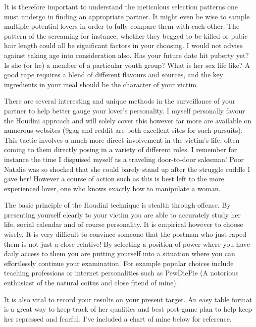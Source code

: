 It is therefore important to understand the meticulous selection patterns one 
must undergo in finding an appropriate partner. It might even be wise to sample 
multiple potential lovers in order to fully compare them with each other. The 
pattern of the screaming for instance, whether they begged to be killed or pubic 
hair length could all be significant factors in your choosing. I would not 
advise against taking age into consideration also. Has your future date hit 
puberty yet? Is she (or he) a member of a particular youth group? What is her 
sex life like? A good rape requires a blend of different flavours and sources, 
and the key ingredients in your meal should be the character of your victim.

There are several interesting and unique methods in the surveillance of your 
partner to help better gauge your lover’s personality. I myself personally 
favour the Houdini approach and will solely cover this however far more are 
available on numerous websites (9gag and reddit are both excellent sites for 
such pursuits). This tactic involves a much more direct involvement in the 
victim’s life, often coming to them directly posing in a variety of different 
roles. I remember for instance the time I disguised myself as a traveling 
door-to-door salesman! Poor Natalie was so shocked that she could barely stand 
up after the struggle cuddle I gave her! However a course of action such as this 
is best left to the more experienced lover, one who knows exactly how to 
manipulate a woman.

The basic principle of the Houdini technique is stealth through offense. By 
presenting yourself clearly to your victim you are able to accurately study her 
life, social calendar and of course personality. It is empirical however to 
choose wisely. It is very difficult to convince someone that the postman who 
just raped them is not just a close relative!  By selecting a position of power 
where you have daily access to them you are putting yourself into a situation 
where you can effortlessly continue your examination. For example popular 
choices include teaching professions or internet personalities such as PewDiePie 
(A notorious enthusiast of the natural coitus and close friend of mine).

It is also vital to record your results on your present target. An easy table 
format is a great way to keep track of her qualities and best post-game plan to 
help keep her repressed and fearful. I’ve included a chart of mine below for 
reference.


